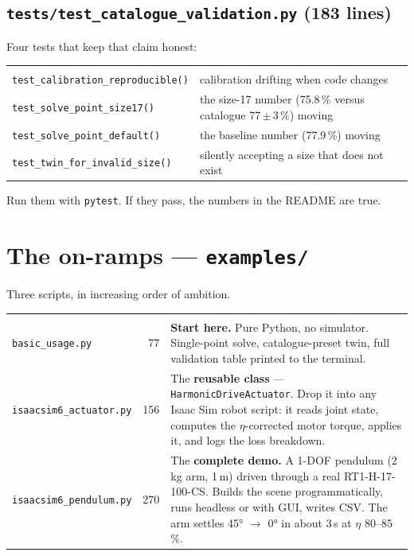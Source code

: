 \documentclass[11pt,a4paper]{article}
\newcommand{\pkg}[1]{\texttt{#1}}
\begin{document}
\subsection{\pkg{tests/test\_catalogue\_validation.py} (183 lines)}

Four tests that keep that claim honest:

\begin{tabularx}{\textwidth}{@{}l Y@{}}
 &  \\
\pkg{test\_calibration\_reproducible()} & calibration drifting when code
changes \\
\pkg{test\_solve\_point\_size17()} & the size-17 number (75.8\,\% versus
catalogue 77\,$\pm$\,3\,\%) moving \\
\pkg{test\_solve\_point\_default()} & the baseline number (77.9\,\%) moving \\
\pkg{test\_twin\_for\_invalid\_size()} & silently accepting a size that does
not exist \\
\end{tabularx}

\vspace{6pt}
\noindent Run them with \pkg{pytest}. If they pass, the numbers in the README
are true.

\section{The on-ramps --- \pkg{examples/}}

Three scripts, in increasing order of ambition.

\begin{tabularx}{\textwidth}{@{}l r Y@{}}
 &  &  \\
\pkg{basic\_usage.py} & 77 & \textbf{Start here.} Pure Python, no simulator.
Single-point solve, catalogue-preset twin, full validation table printed to the
terminal. \\
\pkg{isaacsim6\_actuator.py} & 156 & The \textbf{reusable class} ---
\pkg{HarmonicDriveActuator}. Drop it into any Isaac Sim robot script: it reads
joint state, computes the $\eta$-corrected motor torque, applies it, and logs
the loss breakdown. \\
\pkg{isaacsim6\_pendulum.py} & 270 & The \textbf{complete demo.} A 1-DOF
pendulum (2\,kg arm, 1\,m) driven through a real RT1-H-17-100-CS. Builds the
scene programmatically, runs headless or with GUI, writes CSV. The arm settles
45° $\rightarrow$ 0° in about 3\,s at $\eta$ 80--85\,\%. \\
\end{tabularx}
\end{document}
